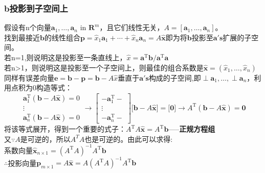 \documentclass[UTF8]{article}
\begin{document}
    \subsubsection{b投影到子空间上}
    假设有n个向量$\boldsymbol{a}_{1}, \ldots, \boldsymbol{a}_{n}$ in $\mathbf{R}^{m}$，且它们线性无关，$A=[\boldsymbol{a}_{1}, \ldots, \boldsymbol{a}_{n}]$。
    \\
    找到最接近$\bm{b}$的线性组合$\boldsymbol{p}=\widehat{x}_{1} \boldsymbol{a}_{1}+\cdots+\widehat{x}_{n} \boldsymbol{a}_{n}=A \widehat{\boldsymbol{x}}$即为将$\bm{b}$投影至$\bm{a's}$扩展的子空间。
    \\
    若n=1,则说明这是投影至一条直线上，$\widehat{x}=\boldsymbol{a}^{\mathrm{T}} \boldsymbol{b} / \boldsymbol{a}^{\mathrm{T}} \boldsymbol{a}$
    \\
    若n>1，则说明这是投影至一个子空间上，则最佳的组合系数是$\widehat{\boldsymbol{x}}=\left(\widehat{x}_{1}, \dots, \widehat{x}_{n}\right)$
    \\
    同样有误差向量$\bm{e}=\bm{b}-\bm{p}=\bm{b}-A \widehat{x}$垂直于$\bm{a's}$构成的子空间,即$\perp \boldsymbol{a}_{1}, \ldots, \perp \boldsymbol{a}_{n}$，利用点积为0构造等式：
    \\
    $$
    \begin{array}{c}
        \boldsymbol{a}_{1}^{\mathrm{T}}(\boldsymbol{b}-A \widehat{\boldsymbol{x}})=0\\
        \vdots  \\
        \boldsymbol{a}_{n}^{\mathrm{T}}(\boldsymbol{b}-A \widehat{\boldsymbol{x}})=0
    \end{array}
    \rightarrow
    \left[\begin{array}{c}{-\boldsymbol{a}_{1}^{\mathrm{T}}-} \\ {\vdots} \\ {-\boldsymbol{a}_{n}^{\mathrm{T}}-}\end{array}\right]\Bigg[\boldsymbol{b}-A \widehat{\boldsymbol{x}}\Bigg]=\Bigg[\mathbf{0}\Bigg]
    \rightarrow
    A^{\mathrm{T}}(\boldsymbol{b}-A \widehat{\boldsymbol{x}})=\mathbf{0}
    $$
    将该等式展开，得到一个重要的式子：$A^{\mathrm{T}} A \widehat{\boldsymbol{x}}=A^{\mathrm{T}} \boldsymbol{b}$-----\textbf{正规方程组}
    \\
    又$\because A$是可逆的，所以$A^T A$也是可逆的。由此可以求得:\\
    系数向量$\widehat{\bm{x}}_{n\times 1}=\left(A^{\mathrm{T}} A\right)^{-1} A^{\mathrm{T}} \boldsymbol{b}$
    \\
    $\therefore$投影向量$\bm{p}_{m\times 1}=A \widehat{\bm{x}}=A\left(A^{\mathrm{T}} A\right)^{-1} A^{\mathrm{T}} \bm{b}$
\end{document}
